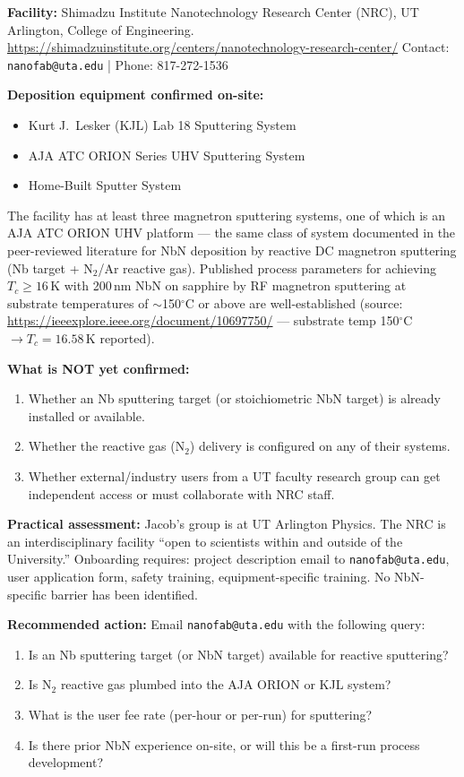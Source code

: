 \textbf{Facility:} Shimadzu Institute Nanotechnology Research Center (NRC), UT Arlington,
College of Engineering. \url{https://shimadzuinstitute.org/centers/nanotechnology-research-center/}
Contact: \texttt{nanofab@uta.edu} | Phone: 817-272-1536

\textbf{Deposition equipment confirmed on-site:}
\begin{itemize}
  \item Kurt J.\ Lesker (KJL) Lab 18 Sputtering System
  \item AJA ATC ORION Series UHV Sputtering System
  \item Home-Built Sputter System
\end{itemize}
The facility has at least three magnetron sputtering systems, one of which is an AJA ATC ORION UHV platform
--- the same class of system documented in the peer-reviewed literature for NbN deposition by reactive DC
magnetron sputtering (Nb target + N$_2$/Ar reactive gas). Published process parameters for achieving
$T_c \geq 16$\,K with 200\,nm NbN on sapphire by RF magnetron sputtering at substrate temperatures of
$\sim$150$^\circ$C or above are well-established
(source: \url{https://ieeexplore.ieee.org/document/10697750/} --- substrate temp 150$^\circ$C $\to T_c = 16.58$\,K reported).

\textbf{What is NOT yet confirmed:}
\begin{enumerate}
  \item Whether an Nb sputtering target (or stoichiometric NbN target) is
    already installed or available.
  \item Whether the reactive gas (N$_2$) delivery is configured on any of their systems.
  \item Whether external/industry users from a UT faculty research group can get independent access
    or must collaborate with NRC staff.
\end{enumerate}

\textbf{Practical assessment:}
Jacob's group is at UT Arlington Physics. The NRC is an interdisciplinary facility
``open to scientists within and outside of the University.'' Onboarding requires:
project description email to \texttt{nanofab@uta.edu}, user application form,
safety training, equipment-specific training. No NbN-specific barrier has been identified.

\textbf{Recommended action:} Email \texttt{nanofab@uta.edu} with the following query:
\begin{enumerate}
  \item Is an Nb sputtering target (or NbN target) available for reactive sputtering?
  \item Is N$_2$ reactive gas plumbed into the AJA ORION or KJL system?
  \item What is the user fee rate (per-hour or per-run) for sputtering?
  \item Is there prior NbN experience on-site, or will this be a first-run process development?
\end{enumerate}

